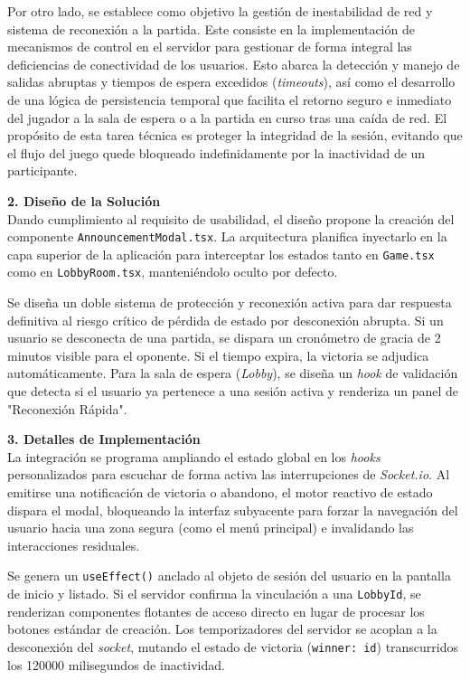 Por otro lado, se establece como objetivo la gestión de inestabilidad de red y sistema de reconexión a la partida. Este consiste en la implementación de mecanismos de control en el servidor para gestionar de forma integral las deficiencias de conectividad de los usuarios. Esto abarca la detección y manejo de salidas abruptas y tiempos de espera excedidos (\textit{timeouts}), así como el desarrollo de una lógica de persistencia temporal que facilita el retorno seguro e inmediato del jugador a la sala de espera o a la partida en curso tras una caída de red. El propósito de esta tarea técnica es proteger la integridad de la sesión, evitando que el flujo del juego quede bloqueado indefinidamente por la inactividad de un participante.

\textbf{2. Diseño de la Solución} \\
Dando cumplimiento al requisito de usabilidad, el diseño propone la creación del componente \texttt{AnnouncementModal.tsx}. La arquitectura planifica inyectarlo en la capa superior de la aplicación para interceptar los estados tanto en \texttt{Game.tsx} como en \texttt{LobbyRoom.tsx}, manteniéndolo oculto por defecto.

Se diseña un doble sistema de protección y reconexión activa para dar respuesta definitiva al riesgo crítico de pérdida de estado por desconexión abrupta. Si un usuario se desconecta de una partida, se dispara un cronómetro de gracia de 2 minutos visible para el oponente. Si el tiempo expira, la victoria se adjudica automáticamente. Para la sala de espera (\textit{Lobby}), se diseña un \textit{hook} de validación que detecta si el usuario ya pertenece a una sesión activa y renderiza un panel de "Reconexión Rápida".

\textbf{3. Detalles de Implementación} \\
La integración se programa ampliando el estado global en los \textit{hooks} personalizados para escuchar de forma activa las interrupciones de \textit{Socket.io}. Al emitirse una notificación de victoria o abandono, el motor reactivo de estado dispara el modal, bloqueando la interfaz subyacente para forzar la navegación del usuario hacia una zona segura (como el menú principal) e invalidando las interacciones residuales.

Se genera un \texttt{useEffect()} anclado al objeto de sesión del usuario en la pantalla de inicio y listado. Si el servidor confirma la vinculación a una \texttt{LobbyId}, se renderizan componentes flotantes de acceso directo en lugar de procesar los botones estándar de creación. Los temporizadores del servidor se acoplan a la desconexión del \textit{socket}, mutando el estado de victoria (\texttt{winner: id}) transcurridos los 120000 milisegundos de inactividad.

